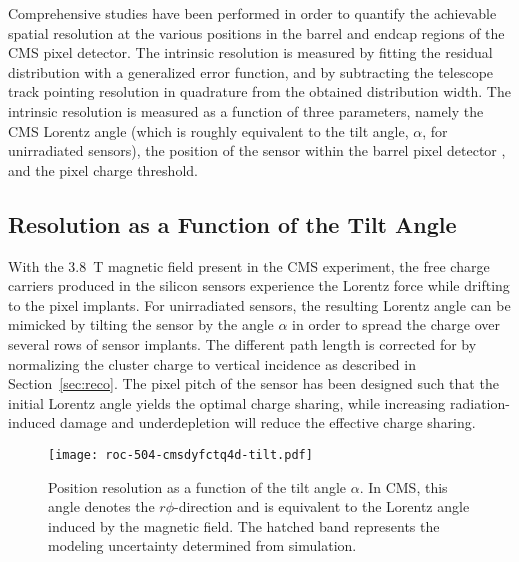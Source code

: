 \documentclass[a4paper,11pt]{article}
\begin{document}
Comprehensive studies have been performed in order to quantify the achievable spatial resolution at the various positions in the barrel and endcap regions of the CMS pixel detector.
The intrinsic resolution is measured by fitting the residual distribution with a generalized error function, and by subtracting the telescope track pointing resolution in quadrature from the obtained distribution width.
The intrinsic resolution is measured as a function of three parameters, namely the CMS Lorentz angle (which is roughly equivalent to the tilt angle, $\alpha$, for unirradiated sensors), the position of the sensor within the barrel pixel detector%
, and the pixel charge threshold.

\subsection{Resolution as a Function of the Tilt Angle}
\label{sec:lorentz}

With the \SI{3.8}{\tesla} magnetic field present in the CMS experiment, the free charge carriers produced in the silicon sensors experience the Lorentz force while drifting to the pixel implants.
For unirradiated sensors, the resulting Lorentz angle can be mimicked by tilting the sensor by the angle $\alpha$ in order to spread the charge over several rows of sensor implants.
The different path length is corrected for by normalizing the cluster charge to vertical incidence as described in Section~\ref{sec:reco}.
The pixel pitch of the sensor has been designed such that the initial Lorentz angle yields the optimal charge sharing, while increasing radiation-induced damage and underdepletion will reduce the effective charge sharing.

\begin{figure}[tbp]
  \centering
  \texttt{[image: roc-504-cmsdyfctq4d-tilt.pdf]}
  \caption[Position resolution as a function of the Lorentz angle]{Position resolution as a function of the tilt angle $\alpha$. In CMS, this angle denotes the $r\phi$-direction and is equivalent to the Lorentz angle induced by the magnetic field. The hatched band represents the modeling uncertainty determined from simulation.}
  \label{fig:cmsdyvstilt504}
\end{figure}
\end{document}
